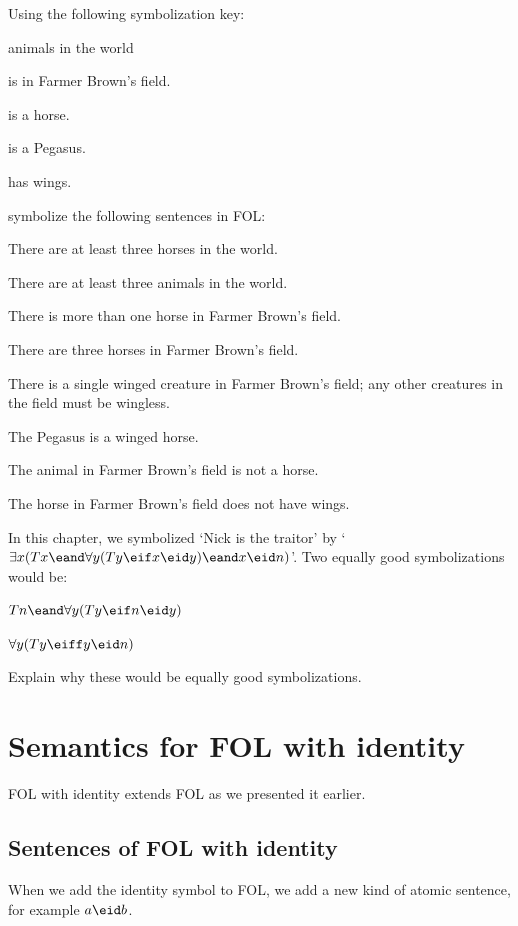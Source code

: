 \begin{practiceproblems}
\problempart Using the following symbolization key:
\begin{ekey}
\item[\text{domain}] animals in the world
\item[Bx]  is in Farmer Brown's field.
\item[Hx]  is a horse.
\item[Px]  is a Pegasus.
\item[Wx]  has wings.
\end{ekey}
symbolize the following sentences in FOL:
\begin{problemslist}
\item There are at least three horses in the world.
\item There are at least three animals in the world.
\item There is more than one horse in Farmer Brown's field.
\item There are three horses in Farmer Brown's field.
\item There is a single winged creature in Farmer Brown's field; any other creatures in the field must be wingless.
\item The Pegasus is a winged horse.
\item The animal in Farmer Brown's field is not a horse.
\item The horse in Farmer Brown's field does not have wings.
\end{problemslist}

\problempart
In this chapter, we symbolized `Nick is the traitor' by `$\exists x (Tx \eand \forall y(Ty \eif x \eid y) \eand x \eid n)$'. Two equally good symbolizations would be:
	\begin{ebullet}
		\item $Tn \eand \forall y(Ty \eif n \eid y)$
		\item $\forall y(Ty \eiff y \eid n)$
	\end{ebullet}
Explain why these would be equally good symbolizations.

\end{practiceproblems}


\chapter{Semantics for FOL with identity}
FOL with identity extends FOL as we presented it earlier.
\section{Sentences of FOL with identity}When we add the identity symbol to FOL, we add a new kind of atomic sentence, for example $a\eid b$.

